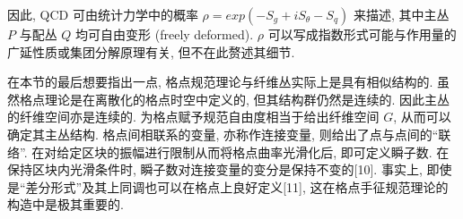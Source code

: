 \documentclass{article}
\begin{document}
\par 因此, QCD 可由统计力学中的概率 $\rho= exp(-S_g +iS_\theta-S_q)$ 来描述, 其中主丛 $P$ 与配丛 $Q$ 均可自由变形 (freely deformed). $\rho$ 可以写成指数形式可能与作用量的广延性质或集团分解原理有关, 但不在此赘述其细节.

\par 在本节的最后想要指出一点, 格点规范理论与纤维丛实际上是具有相似结构的. 虽然格点理论是在离散化的格点时空中定义的, 但其结构群仍然是连续的. 因此主丛的纤维空间亦是连续的. 为格点赋予规范自由度相当于给出纤维空间 $G$, 从而可以确定其主丛结构. 格点间相联系的变量, 亦称作连接变量, 则给出了点与点间的``联络''. 在对给定区块的振幅进行限制从而将格点曲率光滑化后, 即可定义瞬子数. 在保持区块内光滑条件时, 瞬子数对连接变量的变分是保持不变的[10]. 事实上, 即使是``差分形式''及其上同调也可以在格点上良好定义[11], 这在格点手征规范理论的构造中是极其重要的.
\end{document}
